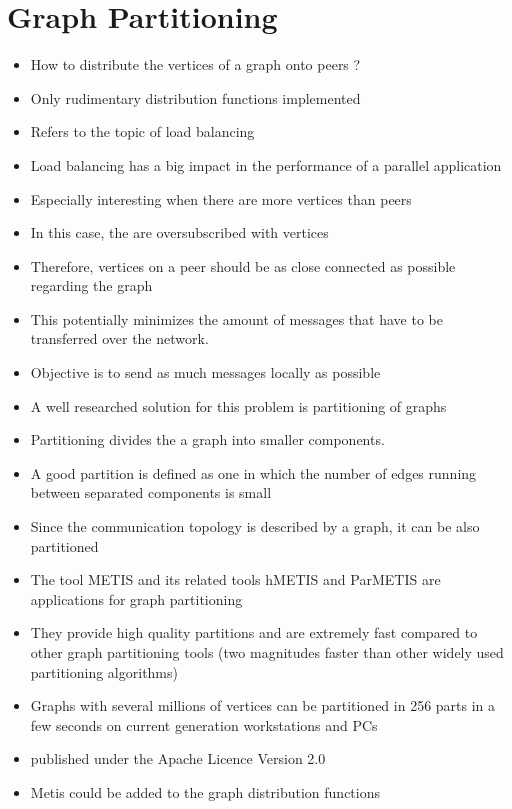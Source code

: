 \section*{Graph Partitioning}
\begin{itemize}

\item How to distribute the vertices of a graph onto peers ?
\item Only rudimentary distribution functions implemented
\item Refers to the topic of load balancing
\item Load balancing has a big impact in the performance of a parallel
  application
\item Especially interesting when there are more vertices than peers
\item In this case, the are oversubscribed with vertices
\item Therefore, vertices on a peer should be as close connected as
  possible regarding the graph
\item This potentially minimizes the amount of messages that have to
  be transferred over the network.
\item Objective is to send as much messages locally as possible

\item A well researched solution for this problem is partitioning of
  graphs
\item Partitioning divides the a graph into smaller components.
\item A good partition is defined as one in which the number of edges
  running between separated components is small
\item Since the communication topology is described by a graph, it can
  be also partitioned

\item The tool METIS and its related tools hMETIS and ParMETIS are
  applications for graph partitioning
\item They provide high quality partitions and are extremely fast
  compared to other graph partitioning tools (two magnitudes faster
  than other widely used partitioning algorithms)
\item Graphs with several millions of vertices can be partitioned in
  256 parts in a few seconds on current generation workstations and
  PCs
\item published under the Apache Licence Version 2.0
\item Metis could be added to the graph distribution functions

\end{itemize}

